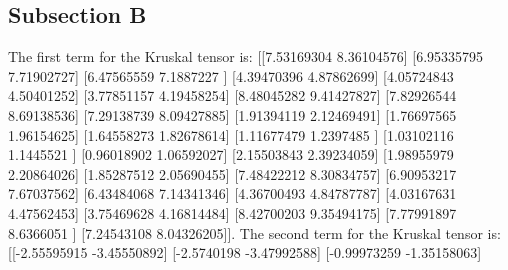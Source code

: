 \documentclass{article}%
\begin{document}
\subsection{Subsection B}%
\label{subsec:SubsectionB}%
The first term for the Kruskal tensor is: {[}{[}7.53169304 8.36104576{]}\newline%
 {[}6.95335795 7.71902727{]}\newline%
 {[}6.47565559 7.1887227 {]}\newline%
 {[}4.39470396 4.87862699{]}\newline%
 {[}4.05724843 4.50401252{]}\newline%
 {[}3.77851157 4.19458254{]}\newline%
 {[}8.48045282 9.41427827{]}\newline%
 {[}7.82926544 8.69138536{]}\newline%
 {[}7.29138739 8.09427885{]}\newline%
 {[}1.91394119 2.12469491{]}\newline%
 {[}1.76697565 1.96154625{]}\newline%
 {[}1.64558273 1.82678614{]}\newline%
 {[}1.11677479 1.2397485 {]}\newline%
 {[}1.03102116 1.1445521 {]}\newline%
 {[}0.96018902 1.06592027{]}\newline%
 {[}2.15503843 2.39234059{]}\newline%
 {[}1.98955979 2.20864026{]}\newline%
 {[}1.85287512 2.05690455{]}\newline%
 {[}7.48422212 8.30834757{]}\newline%
 {[}6.90953217 7.67037562{]}\newline%
 {[}6.43484068 7.14341346{]}\newline%
 {[}4.36700493 4.84787787{]}\newline%
 {[}4.03167631 4.47562453{]}\newline%
 {[}3.75469628 4.16814484{]}\newline%
 {[}8.42700203 9.35494175{]}\newline%
 {[}7.77991897 8.6366051 {]}\newline%
 {[}7.24543108 8.04326205{]}{]}.%
The second term for the Kruskal tensor is: {[}{[}{-}2.55595915 {-}3.45550892{]}\newline%
 {[}{-}2.5740198  {-}3.47992588{]}\newline%
 {[}{-}0.99973259 {-}1.35158063{]}\newline%
\end{document}
